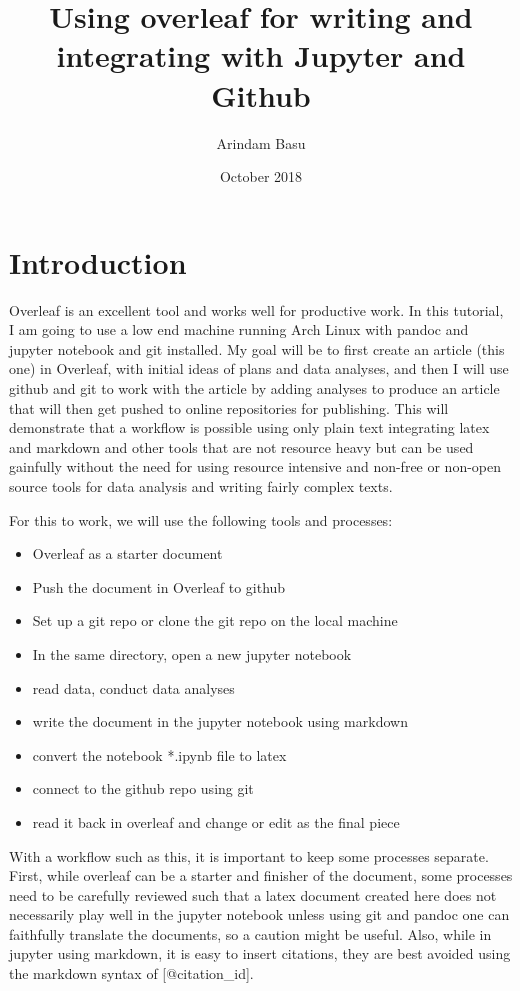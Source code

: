 \documentclass{article}
\title{Using overleaf for writing and integrating with Jupyter and Github}
\author{Arindam Basu}
\date{October 2018}
\begin{document}
\maketitle

\section{Introduction}
Overleaf is an excellent tool and works well for productive work. In this tutorial, I am going to use a low end machine running Arch Linux with pandoc and jupyter notebook and git installed. My goal will be to first create an article (this one) in Overleaf, with initial ideas of plans and data analyses, and then I will use github and git to work with the article by adding analyses to produce an article that will then get pushed to online repositories for publishing. This will demonstrate that a workflow is possible using only plain text integrating latex and markdown and other tools that are not resource heavy but can be used gainfully without the need for using resource intensive and non-free or non-open source tools for data analysis and writing fairly complex texts. 

For this to work, we will use the following tools and processes:

\begin{itemize}
    \item Overleaf as a starter document
    \item Push the document in Overleaf to github
    \item Set up a git repo or clone the git repo on the local machine
    \item In the same directory, open a new jupyter notebook
    \item read data, conduct data analyses
    \item write the document in the jupyter notebook using markdown
    \item convert the notebook *.ipynb file to latex
    \item connect to the github repo using git
    \item read it back in overleaf and change or edit as the final piece

\end{itemize}

With a workflow such as this, it is important to keep some processes separate. First, while overleaf can be a starter and finisher of the document, some processes need to be carefully reviewed such that a latex document created here does not necessarily play well in the jupyter notebook unless using git and pandoc one can faithfully translate the documents, so a caution might be useful. Also, while in jupyter using markdown, it is easy to insert citations, they are best avoided using the markdown syntax of [@citation\_id].
\end{document}

